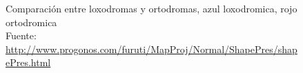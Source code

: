 \documentclass[a4paper,12pt,twoside]{article}
\begin{document}
\begin{description}
\begin{figure}[!h]
  \centering
  \caption{Comparaci\'on entre loxodromas y ortodromas, azul loxodromica, rojo ortodromica \\{\footnotesize Fuente: \url{http://www.progonos.com/furuti/MapProj/Normal/ShapePres/shapePres.html}}}
  \label{fig:comparacion.entre.loxodromas.y.ortodromas}
\end{figure}

\end{description}
\end{document}
